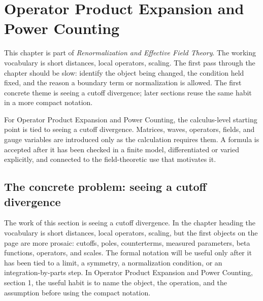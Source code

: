 \chapter{Operator Product Expansion and Power Counting}


This chapter is part of \emph{Renormalization and Effective Field Theory}.  The working vocabulary is short distances, local operators, scaling.  The first pass through the chapter should be slow: identify the object being changed, the condition held fixed, and the reason a boundary term or normalization is allowed.  The first concrete theme is seeing a cutoff divergence; later sections reuse the same habit in a more compact notation.

For Operator Product Expansion and Power Counting, the calculus-level starting point is tied to seeing a cutoff divergence.  Matrices, waves, operators, fields, and gauge variables are introduced only as the calculation requires them.  A formula is accepted after it has been checked in a finite model, differentiated or varied explicitly, and connected to the field-theoretic use that motivates it.

\section{The concrete problem: seeing a cutoff divergence}













The work of this section is seeing a cutoff divergence.  In the chapter heading the vocabulary is short distances, local operators, scaling, but the first objects on the page are more prosaic: cutoffs, poles, counterterms, measured parameters, beta functions, operators, and scales.  The formal notation will be useful only after it has been tied to a limit, a symmetry, a normalization condition, or an integration-by-parts step.  In Operator Product Expansion and Power Counting, section 1, the useful habit is to name the object, the operation, and the assumption before using the compact notation.

